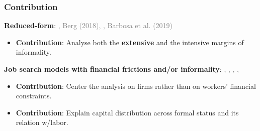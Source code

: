 \documentclass[aspectratio=169]{beamer} %
\begin{document}
\begin{frame}
\frametitle{\textbf{Contribution}}
\label{contribution}


\textbf{Reduced-form}: \textcolor{gray}{\cite{gutierrez2023credit}, Berg (2018), \cite{greenstone2020credit}, Barbosa et al. (2019)}
\vspace{3mm}
\begin{itemize}
    \item \textbf{Contribution}: Analyse both the \textbf{extensive} and the intensive margins of informality.
\end{itemize}


\vspace{8mm}

\textbf{Job search models with financial frictions and/or informality}: \textcolor{gray}{\cite{flabbi2022working}, \cite{haanwinckel2021workforce}, \cite{meghir2015wages}, \cite{lise2013job}, \cite{krusell2010labour}}
\vspace{3mm}
\begin{itemize}
    \item \textbf{Contribution}: Center the analysis on firms rather than on workers' financial constraints. 
    \item \textbf{Contribution}: Explain capital distribution across formal status and its relation w/labor. 
\end{itemize}











\end{frame}
\end{document}
